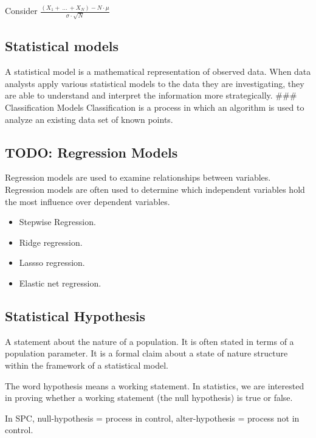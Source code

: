 \documentclass[11pt]{article}
\begin{document}
Consider
\(\frac{(X_1 + \ ... \ +X_N ) - N \cdot \mu}{\sigma \cdot \sqrt{N}}\)

\hypertarget{statistical-models}{%
\subsection{Statistical models}\label{statistical-models}}

A statistical model is a mathematical representation of observed data.
When data analysts apply various statistical models to the data they are
investigating, they are able to understand and interpret the information
more strategically. \#\#\# Classification Models Classification is a
process in which an algorithm is used to analyze an existing data set of
known points.

\hypertarget{regression-models}{%
\subsection{TODO: Regression Models}\label{regression-models}}

Regression models are used to examine relationships between variables.
Regression models are often used to determine which independent
variables hold the most influence over dependent variables.
\begin{itemize}
  \item Stepwise Regression.
  \item Ridge regression.
  \item Lassso regression. 
  \item Elastic net regression.
\end{itemize}

\hypertarget{statistical-hypothesis}{%
\subsection{Statistical Hypothesis}\label{statistical-hypothesis}}

A statement about the nature of a population. It is often stated in
terms of a population parameter. It is a formal claim about a state of
nature structure within the framework of a statistical model.

The word hypothesis means a working statement. In statistics, we are
interested in proving whether a working statement (the null hypothesis)
is true or false.

In SPC, null-hypothesis = process in control, alter-hypothesis = process
not in control.
\end{document}
